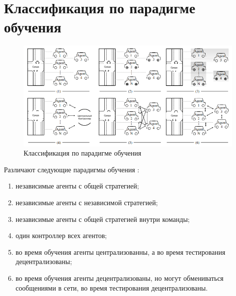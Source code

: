 %
%
%
%
\section{Классификация по парадигме обучения}

\begin{figure}[H]
	\begin{center}
	\includegraphics[pages=-, width=140mm]{./inc/img/paradigm.png}
	\caption{Классификация по парадигме обучения}
	\label{fig:paradigms}
\end{center}
\end{figure}


Различают следующие парадигмы обучения \cite{DBLP:journals/corr/abs-2011-00583}:
\begin{enumerate}[label=\arabic*)]
	\item независимые агенты с общей стратегией;
	\item независимые агенты с независимой стратегией;
	\item независимые агенты с общей стратегией внутри команды;
	\item один контроллер всех агентов;
	\item во время обучения агенты централизованны, а во время тестирования децентрализованы;
	\item во время обучения агенты децентрализованы, но могут обмениваться сообщениями в сети, во время тестирования децентрализованы.
\end{enumerate}



